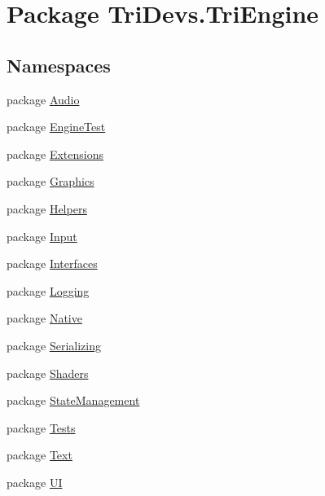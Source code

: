 \hypertarget{namespace_tri_devs_1_1_tri_engine}{\section{Package Tri\-Devs.\-Tri\-Engine}
\label{namespace_tri_devs_1_1_tri_engine}
}
\subsection*{Namespaces}
\begin{DoxyCompactItemize}
\item 
package \hyperlink{namespace_tri_devs_1_1_tri_engine_1_1_audio}{Audio}
\item 
package \hyperlink{namespace_tri_devs_1_1_tri_engine_1_1_engine_test}{Engine\-Test}
\item 
package \hyperlink{namespace_tri_devs_1_1_tri_engine_1_1_extensions}{Extensions}
\item 
package \hyperlink{namespace_tri_devs_1_1_tri_engine_1_1_graphics}{Graphics}
\item 
package \hyperlink{namespace_tri_devs_1_1_tri_engine_1_1_helpers}{Helpers}
\item 
package \hyperlink{namespace_tri_devs_1_1_tri_engine_1_1_input}{Input}
\item 
package \hyperlink{namespace_tri_devs_1_1_tri_engine_1_1_interfaces}{Interfaces}
\item 
package \hyperlink{namespace_tri_devs_1_1_tri_engine_1_1_logging}{Logging}
\item 
package \hyperlink{namespace_tri_devs_1_1_tri_engine_1_1_native}{Native}
\item 
package \hyperlink{namespace_tri_devs_1_1_tri_engine_1_1_serializing}{Serializing}
\item 
package \hyperlink{namespace_tri_devs_1_1_tri_engine_1_1_shaders}{Shaders}
\item 
package \hyperlink{namespace_tri_devs_1_1_tri_engine_1_1_state_management}{State\-Management}
\item 
package \hyperlink{namespace_tri_devs_1_1_tri_engine_1_1_tests}{Tests}
\item 
package \hyperlink{namespace_tri_devs_1_1_tri_engine_1_1_text}{Text}
\item 
package \hyperlink{namespace_tri_devs_1_1_tri_engine_1_1_u_i}{U\-I}
\end{DoxyCompactItemize}
